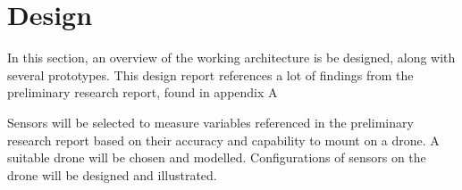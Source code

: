 \newpage
\section{Design}
In this section, an overview of the working architecture is be designed, along with several prototypes. This design report references a lot of findings from the preliminary research report, found in appendix A \cite{prr}

Sensors will be selected to measure variables referenced in the preliminary research report based on their accuracy and capability to mount on a drone. A suitable drone will be chosen and modelled. Configurations of sensors on the drone will be designed and illustrated.





